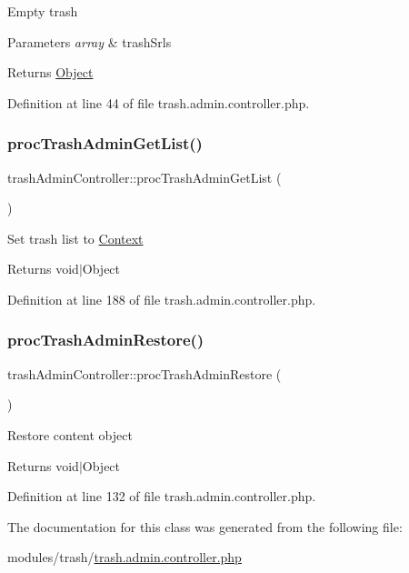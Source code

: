 Empty trash 
\begin{DoxyParams}{Parameters}
{\em array} & trash\+Srls \\
\hline
\end{DoxyParams}
\begin{DoxyReturn}{Returns}
\hyperlink{classObject}{Object} 
\end{DoxyReturn}


Definition at line 44 of file trash.\+admin.\+controller.\+php.

\hypertarget{classtrashAdminController_af522d8b4cd292cce44ea6b1cedfcf0c1}{}\label{classtrashAdminController_af522d8b4cd292cce44ea6b1cedfcf0c1} 
\subsubsection{\texorpdfstring{proc\+Trash\+Admin\+Get\+List()}{procTrashAdminGetList()}}
{\footnotesize\ttfamily trash\+Admin\+Controller\+::proc\+Trash\+Admin\+Get\+List (\begin{DoxyParamCaption}{ }\end{DoxyParamCaption})}

Set trash list to \hyperlink{classContext}{Context} \begin{DoxyReturn}{Returns}
void$\vert$\+Object 
\end{DoxyReturn}


Definition at line 188 of file trash.\+admin.\+controller.\+php.

\hypertarget{classtrashAdminController_a5bd5aea6170e91d725b7f758480aba38}{}\label{classtrashAdminController_a5bd5aea6170e91d725b7f758480aba38} 
\subsubsection{\texorpdfstring{proc\+Trash\+Admin\+Restore()}{procTrashAdminRestore()}}
{\footnotesize\ttfamily trash\+Admin\+Controller\+::proc\+Trash\+Admin\+Restore (\begin{DoxyParamCaption}{ }\end{DoxyParamCaption})}

Restore content object \begin{DoxyReturn}{Returns}
void$\vert$\+Object 
\end{DoxyReturn}


Definition at line 132 of file trash.\+admin.\+controller.\+php.



The documentation for this class was generated from the following file\+:\begin{DoxyCompactItemize}
\item 
modules/trash/\hyperlink{trash_8admin_8controller_8php}{trash.\+admin.\+controller.\+php}\end{DoxyCompactItemize}
